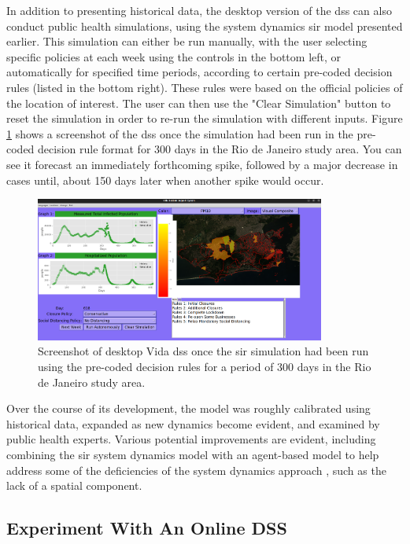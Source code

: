 In addition to presenting historical data, the desktop version of the \ac{dss} can also conduct public health simulations, using the system dynamics \ac{sir} model presented earlier. This simulation can either be run manually, with the user selecting specific policies at each week using the controls in the bottom left, or automatically for specified time periods, according to certain pre-coded decision rules (listed in the bottom right). These rules were based on the official policies of the location of interest. The user can then use the "Clear Simulation" button to reset the simulation in order to re-run the simulation with different inputs. Figure \ref{fig:vida-dss-simulation} shows a screenshot of the \ac{dss} once the simulation had been run in the pre-coded decision rule format for 300 days in the Rio de Janeiro study area. You can see it forecast an immediately forthcoming spike, followed by a major decrease in cases until, about 150 days later when another spike would occur.

\begin{figure}[!htb]
\centering
\includegraphics[width=0.85\textwidth]{Figures/chap5/vida-screenshot-simulation.png}
\caption[Vida DSS SIR Simulation Screenshot]{Screenshot of desktop Vida \ac{dss} once the \ac{sir} simulation had been run using the pre-coded decision rules for a period of 300 days in the Rio de Janeiro study area.}
\label{fig:vida-dss-simulation}
\end{figure}

Over the course of its development, the model was roughly calibrated using historical data, expanded as new dynamics become evident, and examined by public health experts. Various potential improvements are evident, including combining the \ac{sir} system dynamics model with an agent-based model to help address some of the deficiencies of the system dynamics approach \cite{ahmedVarianceSystemDynamics2012}, such as the lack of a spatial component.

\subsection{Experiment With An Online DSS}

